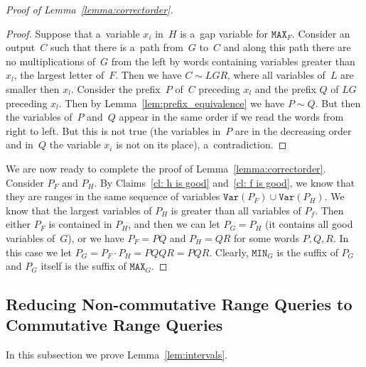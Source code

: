 \documentclass[11pt,letterpaper]{article}
\newcommand{\mmin}{\texttt{MIN}}
\newcommand{\mmax}{\texttt{MAX}}
\newcommand{\var}{\texttt{Var}}
\begin{document}
\begin{proof}[Proof of Lemma~\ref{lemma:correctorder}]
\begin{proof}
Suppose that a~variable $x_i$ in~$H$ is a~gap variable for $\mmax_F$. Consider an output~$C$ such that there is a~path from~$G$ to~$C$ and along this path there are no multiplications of~$G$ from the left by words containing variables greater than $x_l$, the largest letter of~$F$. Then we have $C \sim LGR$, where all variables of~$L$ are smaller then $x_l$. Consider the prefix~$P$ of~$C$ preceding $x_l$ and the prefix $Q$ of $LG$ preceding $x_l$.
Then by Lemma~\ref{lem:prefix_equivalence} we have $P \sim Q$. But then the variables of~$P$ and~$Q$ appear in the same order if we read the words from right to left. But this is not true (the variables in~$P$ are in the decreasing order and in~$Q$ the variable $x_i$ is not on its place), a~contradiction.
\end{proof}

We are now ready to complete the proof of Lemma~\ref{lemma:correctorder}.
Consider $P_F$ and $P_H$. By Claims~\ref{cl: h is good} and~\ref{cl: f is good}, we know that they are ranges in the same sequence of variables $\var(P_F)\cup \var(P_H)$. We know that the largest variables of $P_H$ is greater than all variables of $P_f$. Then either $P_F$ is contained in $P_H$, and then we can let $P_G=P_H$ (it contains all good variables of~$G$), or we have $P_F =PQ$ and $P_H=QR$ for some words $P, Q, R$. In this case we let $P_G = P_F \cdot P_H = PQQR=PQR$. Clearly, $\mmin_G$ is the suffix of $P_G$ and $P_G$ itself is the suffix of $\mmax_G$.
\end{proof}



\subsection{Reducing Non-commutative Range Queries to Commutative Range Queries}

In this subsection we prove Lemma~\ref{lem:intervals}.
\end{document}
